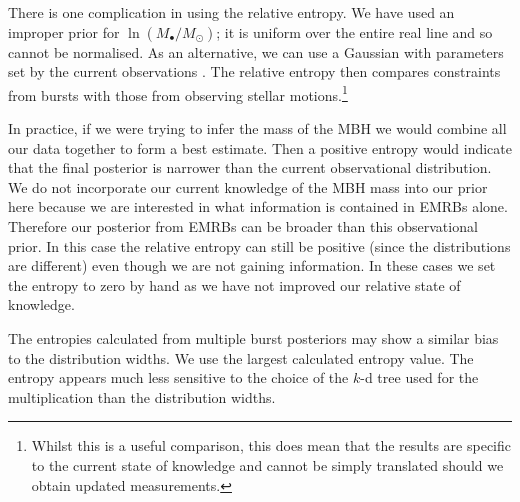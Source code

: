 \documentclass[useAMS,usedcolumn,usegraphicx,usenatbib]{mn2e}
\begin{document}
There is one complication in using the relative entropy. We have used an improper prior for $\ln (M_\bullet/M_\odot)$; it is uniform over the entire real line and so cannot be normalised. As an alternative, we can use a Gaussian with parameters set by the current observations \citep{Gillessen2009}. The relative entropy then compares constraints from bursts with those from observing stellar motions.\footnote{Whilst this is a useful comparison, this does mean that the results are specific to the current state of knowledge and cannot be simply translated should we obtain updated measurements.}

In practice, if we were trying to infer the mass of the MBH we would combine all our data together to form a best estimate. Then a positive entropy would indicate that the final posterior is narrower than the current observational distribution. We do not incorporate our current knowledge of the MBH mass into our prior here because we are interested in what information is contained in EMRBs alone. Therefore our posterior from EMRBs can be broader than this observational prior. In this case the relative entropy can still be positive (since the distributions are different) even though we are not gaining information. In these cases we set the entropy to zero by hand as we have not improved our relative state of knowledge.

The entropies calculated from multiple burst posteriors may show a similar bias to the distribution widths. We use the largest calculated entropy value. The entropy appears much less sensitive to the choice of the $k$-d tree used for the multiplication than the distribution widths.
\end{document}
